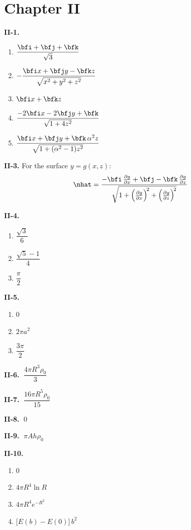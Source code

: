 \section*{Chapter II}

\textbf{II-1.}
\begin{enumerate}[label=(\alph*)]
  \item $\displaystyle \frac{\bfi + \bfj + \bfk}{\sqrt{3}}$
  \item $\displaystyle -\frac{\bfi x + \bfj y - \bfk z}{\sqrt{x^2 + y^2 + z^2}}$
  \item $\bfi x + \bfk z$
  \item $\displaystyle \frac{-2\bfi x - 2\bfj y + \bfk}{\sqrt{1 + 4z^2}}$
  \item $\displaystyle \frac{\bfi x + \bfj y + \bfk\,\alpha^2 z}{\sqrt{1 + (\alpha^2 - 1)z^2}}$
\end{enumerate}

\medskip
\textbf{II-3.} For the surface $y = g(x,z)$:
\[
  \nhat = \frac{-\bfi\,\pd{g}{x} + \bfj - \bfk\,\pd{g}{z}}%
              {\sqrt{1 + \left(\pd{g}{x}\right)^{\!2}
                      + \left(\pd{g}{z}\right)^{\!2}}}
\]

\medskip
\textbf{II-4.}
\begin{enumerate}[label=(\alph*)]
  \item $\dfrac{\sqrt{3}}{6}$
  \item $\dfrac{\sqrt{5}-1}{4}$
  \item $\dfrac{\pi}{2}$
\end{enumerate}

\medskip
\textbf{II-5.}
\begin{enumerate}[label=(\alph*)]
  \item $0$
  \item $2\pi a^2$
  \item $\dfrac{3\pi}{2}$
\end{enumerate}

\medskip
\textbf{II-6.} $\;\dfrac{4\pi R^3\rho_0}{3}$

\medskip
\textbf{II-7.} $\;\dfrac{16\pi R^5\rho_0}{15}$

\medskip
\textbf{II-8.} $\;0$

\medskip
\textbf{II-9.} $\;\pi A h\rho_0$

\medskip
\textbf{II-10.}
\begin{enumerate}[label=(\alph*)]
  \item $0$
  \item $4\pi R^4\ln R$
  \item $4\pi R^4 e^{-R^2}$
  \item $\bigl[E(b) - E(0)\bigr]\,b^2$
\end{enumerate}

